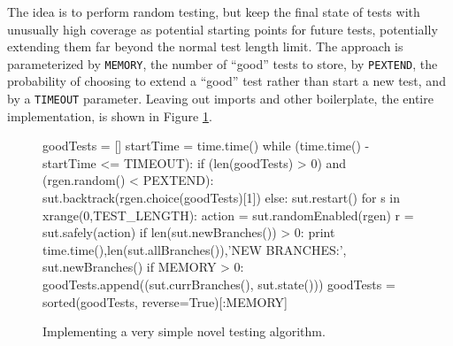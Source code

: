 The idea is to perform random testing, but keep the final state of tests with unusually high coverage as potential starting points for future tests, potentially extending them far beyond the normal test length limit.  The approach is parameterized by {\tt MEMORY}, the number of ``good'' tests to store, by {\tt PEXTEND}, the probability of choosing to extend a ``good'' test rather than start a new test, and by a {\tt TIMEOUT} parameter.  Leaving out imports and other boilerplate, the entire implementation, is shown in Figure \ref{fig:keepgood}.

\begin{figure}
{\scriptsize
\begin{code}
goodTests = []
startTime = time.time()
while (time.time() - startTime <= TIMEOUT):
   if (len(goodTests) > 0) and (rgen.random() < PEXTEND):
     sut.backtrack(rgen.choice(goodTests)[1])
   else:
     sut.restart()
   for s in xrange(0,TEST\_LENGTH): 
      action = sut.randomEnabled(rgen)
      r = sut.safely(action)
      if len(sut.newBranches()) > 0:
         print time.time(),len(sut.allBranches()),'NEW BRANCHES:', sut.newBranches()
   if MEMORY > 0:
      goodTests.append((sut.currBranches(), sut.state()))
      goodTests = sorted(goodTests, reverse=True)[:MEMORY]
\end{code}
}
\caption{Implementing a very simple novel testing algorithm.}
\label{fig:keepgood}
\end{figure}

